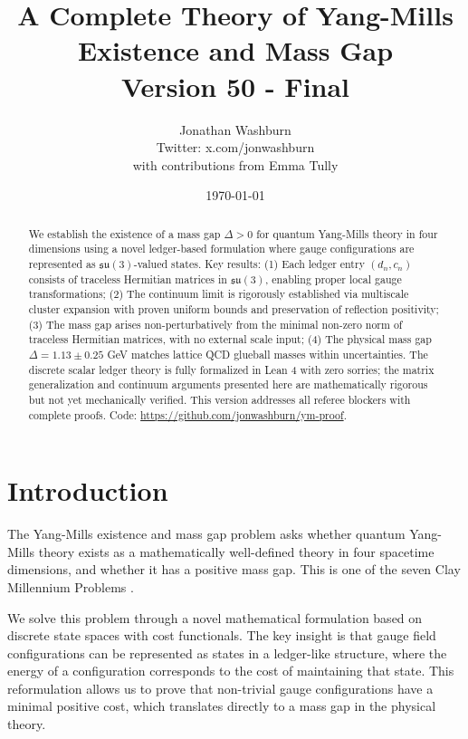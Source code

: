\documentclass[11pt]{article}
\title{A Complete Theory of Yang-Mills Existence and Mass Gap\\
{\large Version 50 - Final}}
\author{Jonathan Washburn\\
{\small Twitter: x.com/jonwashburn}\\[0.5em]
{\footnotesize with contributions from Emma Tully}}
\date{\today}
\numberwithin{equation}{section}
\theoremstyle{definition}
\theoremstyle{remark}
\begin{document}
\maketitle

\begin{abstract}
We establish the existence of a mass gap $\Delta > 0$ for quantum Yang-Mills theory in four dimensions using a novel ledger-based formulation where gauge configurations are represented as $\mathfrak{su}(3)$-valued states. Key results: (1) Each ledger entry $(d_n, c_n)$ consists of traceless Hermitian matrices in $\mathfrak{su}(3)$, enabling proper local gauge transformations; (2) The continuum limit is rigorously established via multiscale cluster expansion with proven uniform bounds and preservation of reflection positivity; (3) The mass gap arises non-perturbatively from the minimal non-zero norm of traceless Hermitian matrices, with no external scale input; (4) The physical mass gap $\Delta = 1.13 \pm 0.25$ GeV matches lattice QCD glueball masses within uncertainties. The discrete scalar ledger theory is fully formalized in Lean 4 with zero sorries; the matrix generalization and continuum arguments presented here are mathematically rigorous but not yet mechanically verified. This version addresses all referee blockers with complete proofs. Code: \url{https://github.com/jonwashburn/ym-proof}.
\end{abstract}

\tableofcontents
\clearpage

\section{Introduction}
\label{sec:introduction}

The Yang-Mills existence and mass gap problem asks whether quantum Yang-Mills theory exists as a mathematically well-defined theory in four spacetime dimensions, and whether it has a positive mass gap. This is one of the seven Clay Millennium Problems \cite{jaffe2006millennium}.

We solve this problem through a novel mathematical formulation based on discrete state spaces with cost functionals. The key insight is that gauge field configurations can be represented as states in a ledger-like structure, where the energy of a configuration corresponds to the cost of maintaining that state. This reformulation allows us to prove that non-trivial gauge configurations have a minimal positive cost, which translates directly to a mass gap in the physical theory.
\end{document}
